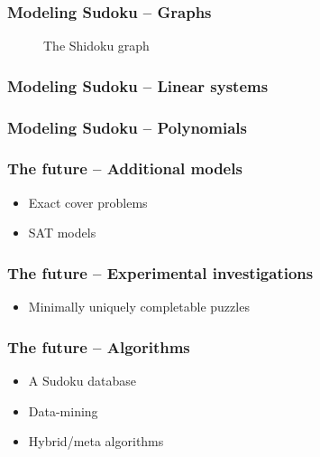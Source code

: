\documentclass{beamer}
\begin{document}
\begin{frame}[fragile]
\frametitle{Modeling Sudoku -- Graphs}
 \begin{figure}[h]
  \centering
  \begin{dot2tex}[circo,mathmode,options={--graphstyle "scale=0.25"}]
   
  \end{dot2tex}
  \caption{The Shidoku graph}
 \end{figure}
\end{frame}

\begin{frame}
\frametitle{Modeling Sudoku -- Linear systems}

\end{frame}

\begin{frame}
\frametitle{Modeling Sudoku -- Polynomials}

\end{frame}

\begin{frame}
\frametitle{The future -- Additional models}
 \begin{itemize}
  \item <1-> Exact cover problems
  \item <2-> SAT models
 \end{itemize}
\end{frame}

\begin{frame}
\frametitle{The future -- Experimental investigations}
 \begin{itemize}
  \item <1-> Minimally uniquely completable puzzles
 \end{itemize}
\end{frame}

\begin{frame}
\frametitle{The future -- Algorithms}
 \begin{itemize}
  \item <1-> A Sudoku database
  \item <2-> Data-mining
  \item <3-> Hybrid/meta algorithms
 \end{itemize}
\end{frame}
\end{document}
